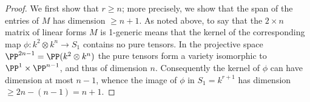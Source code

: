 \begin{lemma}\label{1-generic lemma}
 
\end{lemma}
\begin{proof}
We first show that $r\geq n$; more precisely, we show that the span of the entries of $M$ has dimension $\geq n+1$. As noted above, to say that the $2\times n$ matrix of linear forms $M$ is 1-generic means that
the kernel of the corresponding map $ \phi: k^2\otimes k^n \to S_1$ contains no pure tensors. In the projective
space $\PP^{2n-1} = \PP(k^2\otimes k^n)$ the pure tensors form a variety isomorphic to $\PP^1\times \PP^{n-1}$, and thus of dimension $n$. Consequently the kernel of $\phi$ can have dimension at most $n-1$, whence the image of $\phi$ 
in $S_1 = k^{r+1}$ has dimension  $\geq 2n-(n-1) = n+1$. 
\end{proof}
%
%
%
%
